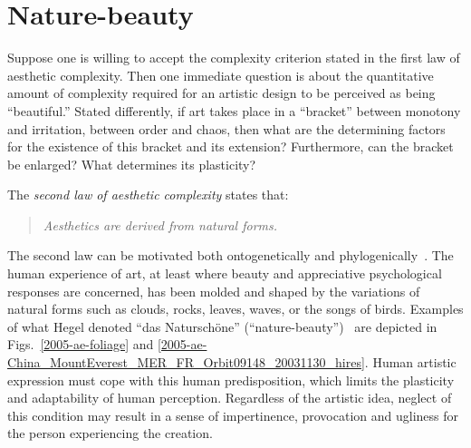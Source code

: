 \documentclass[%
 reprint,
 showpacs,
 showkeys,
 amsmath,
 amssymb,
 aps,
 pra,
 longbibliography,
 floatfix,
 ]{revtex4-1}
\begin{document}

\section{Nature-beauty}

Suppose one is willing to accept the complexity criterion stated in the first law of aesthetic complexity.
Then one immediate question is about the quantitative amount of complexity required for an artistic design to be perceived as being ``beautiful.''
Stated differently, if art takes place in a ``bracket'' between monotony and irritation, between order and chaos, then what are the determining factors for the existence of this bracket and its extension?
Furthermore, can the bracket be enlarged? What determines its plasticity?

The \textit{second law of aesthetic complexity} states that:
\begin{quote}
{\em
Aesthetics are derived from natural forms.
}
\end{quote}

The second law can be motivated both ontogenetically and phylogenically~\cite{gombrich-79}.
The human experience of art, at least where beauty and appreciative psychological responses are concerned, has been molded and shaped by the variations of natural forms such as clouds, rocks, leaves, waves, or the songs of birds.
Examples of what Hegel denoted ``das Natursch{\"o}ne'' (``nature-beauty'')~\cite{bense} are depicted in Figs.~\ref{2005-ae-foliage}
and \ref{2005-ae-China_MountEverest_MER_FR_Orbit09148_20031130_hires}.
Human artistic expression must cope with this human predisposition, which limits the plasticity and adaptability of human perception.
Regardless of the artistic idea, neglect of this condition may result in a sense of impertinence, provocation and ugliness for the person experiencing the creation.
\end{document}
